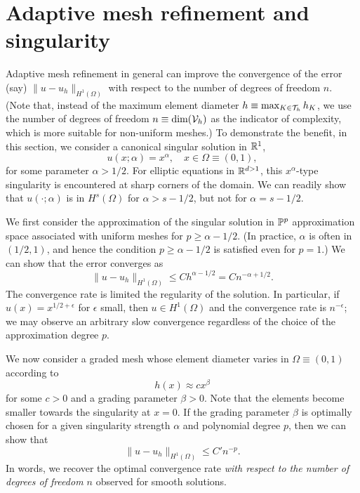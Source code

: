 \section{Adaptive mesh refinement and singularity}
Adaptive mesh refinement in general can improve the convergence of the error (say) $\| u - u_h \|_{H^1(\Omega)}$ with respect to the number of degrees of freedom $n$.  (Note that, instead of the maximum element diameter $h \equiv \max_{K \in \mathcal{T}_h} h_K$, we use the number of degrees of freedom $n \equiv \text{dim}(\mathcal{V}_h)$ as the indicator of complexity, which is more suitable for non-uniform meshes.)  To demonstrate the benefit, in this section, we consider a canonical singular solution in $\mathbb{R}^1$, 
\begin{equation*}
  u(x;\alpha) = x^\alpha, \quad x \in \Omega \equiv (0,1),
\end{equation*}
for some parameter $\alpha > 1/2$. For elliptic equations in $\mathbb{R}^{d > 1}$, this $x^\alpha$-type singularity is encountered at sharp corners of the domain.  We can readily show that $u(\cdot;\alpha)$ is in $H^s(\Omega)$ for $\alpha > s - 1/2$, but not for $\alpha = s - 1/2$.

We first consider the approximation of the singular solution in $\mathbb{P}^p$ approximation space associated with uniform meshes for $p \geq \alpha - 1/2$.  (In practice, $\alpha$ is often in $(1/2,1)$, and hence the condition $p \geq \alpha - 1/2$ is satisfied even for $p = 1$.)  We can show that the error converges as
\begin{equation}
  \| u - u_h \|_{H^1(\Omega)} \leq C h^{\alpha - 1/2} = C n^{-\alpha + 1/2}.
  \label{eq:adapt_singular_uni}
\end{equation}
 The convergence rate is limited the regularity of the solution. In particular, if $u(x) = x^{1/2 + \epsilon}$ for $\epsilon$ small, then $u \in H^1(\Omega)$ and the convergence rate is $n^{-\epsilon}$; we may observe an arbitrary slow convergence regardless of the choice of the approximation degree $p$.

We now consider a graded mesh whose element diameter varies in $\Omega \equiv (0,1)$ according to
\begin{equation*}
  h(x) \approx c x^{\beta}
\end{equation*}
for some $c > 0$ and a grading parameter $\beta > 0$.  Note that the elements become smaller towards the singularity at $x = 0$.  If the grading parameter $\beta$ is optimally chosen for a given singularity strength $\alpha$ and polynomial degree $p$, then we can show that
\begin{equation}
  \| u - u_h \|_{H^1(\Omega)} \leq C' n^{-p}.
  \label{eq:adapt_singular_graded}
\end{equation}
In words, we recover the optimal convergence rate \emph{with respect to the number of degrees of freedom $n$} observed for smooth solutions.

